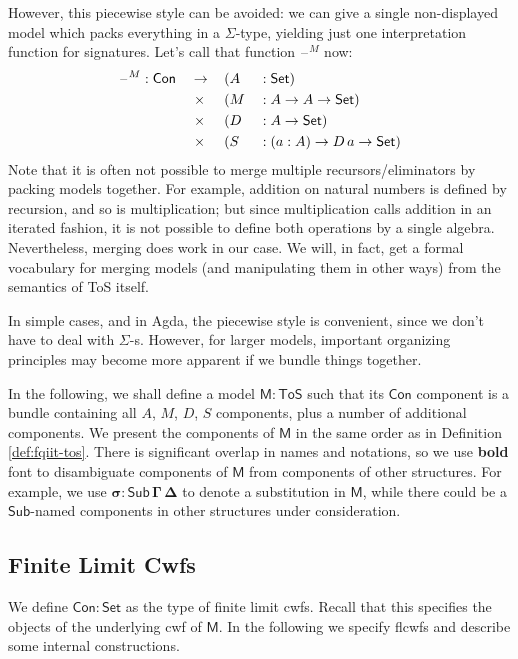 \documentclass[12pt,a4paper,twoside,openany]{book}
\theoremstyle{remark}
\theoremstyle{definition}
\theoremstyle{theorem}
\newcommand{\bs}[1]{\boldsymbol{#1}}
\newcommand{\Con}{\mathsf{Con}}
\newcommand{\Sub}{\mathsf{Sub}}
\newcommand{\blank}{\mathord{\hspace{1pt}\text{--}\hspace{1pt}}}
\newcommand{\Set}{\mathsf{Set}}
\newcommand{\ToS}{\mathsf{ToS}}
\newcommand{\bCon}{\bs{\Con}}
\newcommand{\bM}{\bs{\mathsf{M}}}
\begin{document}
However, this piecewise style can be avoided: we can give a single non-displayed
model which packs everything in a $\Sigma$-type, yielding just one
interpretation function for signatures. Let's call that function $\blank^M$ now:
\begin{alignat*}{5}
  & \blank^M : \Con &&\to \,&&(A &&: \Set)\\
  & &&\hspace{0.3em}\times &&(M  &&: A \to A \to \Set)\\
  & &&\hspace{0.3em}\times &&(D  &&: A \to \Set)\\
  & &&\hspace{0.3em}\times &&(S  &&: (a : A) \to D\,a \to \Set)
\end{alignat*}
Note that it is often not possible to merge multiple recursors/eliminators by
packing models together. For example, addition on natural numbers is defined by
recursion, and so is multiplication; but since multiplication calls addition in
an iterated fashion, it is not possible to define both operations by a single
algebra. Nevertheless, merging does work in our case. We will, in fact, get a
formal vocabulary for merging models (and manipulating them in other ways) from
the semantics of ToS itself.

In simple cases, and in Agda, the piecewise style is convenient, since we don't
have to deal with $\Sigma$-s. However, for larger models, important organizing
principles may become more apparent if we bundle things together.

In the following, we shall define a model $\bM : \ToS$ such that its $\Con$
component is a bundle containing all $A$, $M$, $D$, $S$ components, plus a
number of additional components. We present the components of $\bM$ in the same
order as in Definition \ref{def:fqiit-tos}. There is significant overlap in
names and notations, so we use \textbf{bold} font to disambiguate components of
$\bM$ from components of other structures. For example, we use $\bs{\sigma :
  \Sub\,\Gamma\,\Delta}$ to denote a substitution in $\bM$, while there could be
a $\Sub$-named components in other structures under consideration.

\subsection{Finite Limit Cwfs}

We define $\bCon : \Set$ as the type of finite limit cwfs. Recall that this
specifies the objects of the underlying cwf of $\bM$. In the following we
specify flcwfs and describe some internal constructions.
\end{document}
